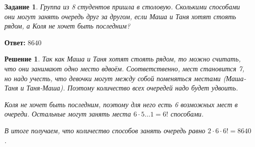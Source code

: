\documentclass[a4paper,oneside]{memoir}
\newtheorem{task}{Задание}
\newtheorem{solution}{Решение}
\begin{document}
\begin{task}
	Группа из 8 студентов пришла в столовую. Сколькими способами они могут занять очередь друг за другом, если Маша и Таня хотят стоять рядом, а Коля не хочет быть последним?
\end{task}

\textbf{Ответ:} $ 8640 $

\begin{solution}
	Так как Маша и Таня хотят стоять рядом, то можно считать, что они занимают одно место вдвоём. Соответственно, мест становится 7, но надо учесть, что девочки могут между собой поменяться местами (Маша-Таня и Таня-Маша). Поэтому количество всех очередей надо будет удвоить.
	
	Коля не хочет быть последним, поэтому для него есть 6 возможных мест в очереди. Остальные могут занять места $ 6 \cdot 5 \dots 1= 6! $ способами.
	
	В итоге получаем, что количество способов занять очередь равно $ 2\cdot 6 \cdot 6! = 8640 $.
\end{solution}
\end{document}
